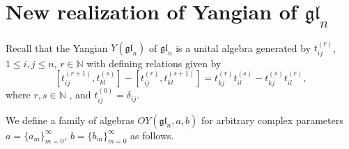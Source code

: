 \documentclass[10pt]{article}%
\numberwithin{equation}{section}
\newtheorem{example}[thm]{Example}
\newcommand{\red}{\color{red}}
\newcommand{\gl}{{\mathfrak{gl}}}
\begin{document}



\section{New realization of Yangian of $\gl_n$}\label{sec:OYangians}
Recall that the Yangian $Y(\gl_n)$ of $\gl_n$ is a unital algebra generated by  
  ${t}_{ij}^{(r)}$, $1\leq i,j\leq n$, $r\in \mathbb N$
with defining relations given by
\begin{equation} \label{eqn:Yangian_p}
[t^{(r+1)}_{ij},t^{(s)}_{kl}]-[t^{(r)}_{ij},t^{(s+1)}_{kl}]=t^{(r)}_{kj}t^{(s)}_{il}-t^{(s)}_{kj}t^{(r)}_{il},
\end{equation}
where $r,s\in \mathbb N$ , and 
$t^{(0)}_{ij}=\delta_{ij}$.


We define a family of algebras $OY(\gl_n,a,b)$
for arbitrary complex parameters $a=\{a_m\}_{m=0}^{\infty}$, $b=\{b_m\}_{m=0}^{\infty}$ as follows.
\end{document}
